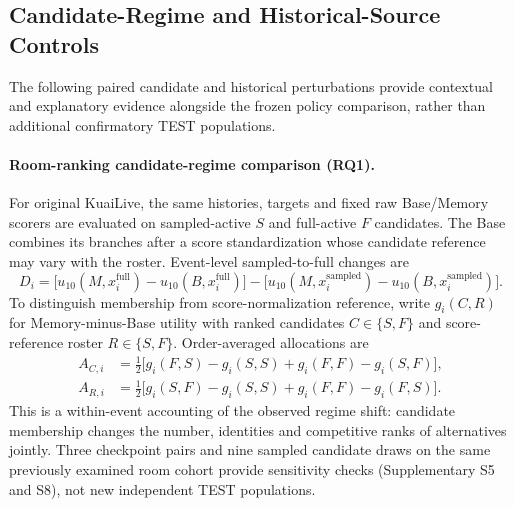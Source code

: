 \subsection{Candidate-Regime and Historical-Source Controls}
\label{sec:exp-regimes}

The following paired candidate and historical perturbations provide contextual and explanatory evidence alongside the frozen policy comparison, rather than additional confirmatory TEST populations.

\paragraph{Room-ranking candidate-regime comparison (RQ1).}
For original KuaiLive, the same histories, targets and fixed raw Base/Memory scorers are evaluated on sampled-active $S$ and full-active $F$ candidates. The Base combines its branches after a score standardization whose candidate reference may vary with the roster. Event-level sampled-to-full changes are
\begin{equation}
D_i =
\big[u_{10}(M,x_i^{\mathrm{full}})-u_{10}(B,x_i^{\mathrm{full}})\big]
-
\big[u_{10}(M,x_i^{\mathrm{sampled}})-u_{10}(B,x_i^{\mathrm{sampled}})\big].
\label{eq:paired-regime-shift}
\end{equation}
To distinguish membership from score-normalization reference, write $g_i(C,R)$ for Memory-minus-Base utility with ranked candidates $C\in\{S,F\}$ and score-reference roster $R\in\{S,F\}$. Order-averaged allocations are
\begin{align}
A_{C,i}&=\tfrac12\big[g_i(F,S)-g_i(S,S)+g_i(F,F)-g_i(S,F)\big],\nonumber\\
A_{R,i}&=\tfrac12\big[g_i(S,F)-g_i(S,S)+g_i(F,F)-g_i(F,S)\big].
\label{eq:factorial-allocations}
\end{align}
This is a within-event accounting of the observed regime shift: candidate membership changes the number, identities and competitive ranks of alternatives jointly. Three checkpoint pairs and nine sampled candidate draws on the same previously examined room cohort provide sensitivity checks (Supplementary S5 and S8), not new independent TEST populations.


